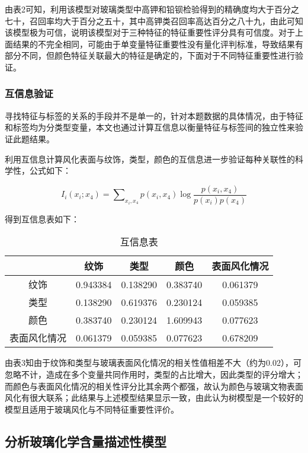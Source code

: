 由表2可知，利用该模型对玻璃类型中高钾和铅钡检验得到的精确度均大于百分之七十，召回率均大于百分之五十，其中高钾类召回率高达百分之八十九，由此可知该模型极为可信，说明该模型对于三种特征的特征重要性评分具有可信度。对于上面结果的不完全相同，可能由于单变量特征重要性没有量化评判标准，导致结果有部分不同，但颜色特征关联最大的特征是确定的，下面对于不同特征重要性进行验证。


\subsubsection{互信息验证}

寻找特征与标签的关系的手段并不是单一的，针对本题数据的具体情况，由于特征和标签均为分类型变量，本文也通过计算互信息以衡量特征与标签间的独立性来验证此题结果。

利用互信息计算风化表面与纹饰，类型，颜色的互信息进一步验证每种关联性的科学性，公式如下：

\begin{equation}
    {{I}_{i}}\left( {{x}_{i}};{{x}_{4}} \right)=\displaystyle\sum\nolimits_{{{x}_{i}},{{x}_{4}}}{p({{x}_{i}},{{x}_{4}})}\log \frac{p({{x}_{i}},{{x}_{4}})}{p({{x}_{i}})p({{x}_{4}})}
\end{equation}

得到互信息表如下： 

\begin{table}[H]
	\centering
	\begin{tabular}{c c c c c} 
	    \toprule[1.5pt]
		& 纹饰 &	类型 &	颜色 &	表面风化情况 \\ 
		\midrule[1pt]
		纹饰 & 	0.943384 &	0.138290 & 	0.383740 &	0.061379 \\
		\hline
		类型 &	0.138290 &	0.619376 &	0.230124 &	0.059385 \\
		\hline
		颜色 &	0.383740 &	0.230124 &	1.609943 &	0.077623 \\
		\hline
		表面风化情况 &	0.061379 &	0.059385 &	0.077623 &	0.678209 \\
	    \toprule[1.5pt]
	\end{tabular}
\caption{互信息表}
\end{table}


由表3知由于纹饰和类型与玻璃表面风化情况的相关性值相差不大（约为0.02），可忽略不计，造成在多个变量共同作用时，类型的占比增大，因此类型的评分增大；而颜色与表面风化情况的相关性评分比其余两个都强，故认为颜色与玻璃文物表面风化有很大联系；此结果与上述模型结果显示一致，由此认为树模型是一个较好的模型且适用于玻璃风化与不同特征重要性评价。

\subsection{分析玻璃化学含量描述性模型}

